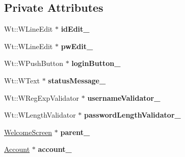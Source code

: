 \subsection*{Private Attributes}
\begin{DoxyCompactItemize}
\item 
Wt\+::\+W\+Line\+Edit $\ast$ {\bfseries id\+Edit\+\_\+}\hypertarget{classLoginWidget_abc73734457aad449ae29568968397304}{}\label{classLoginWidget_abc73734457aad449ae29568968397304}

\item 
Wt\+::\+W\+Line\+Edit $\ast$ {\bfseries pw\+Edit\+\_\+}\hypertarget{classLoginWidget_aa1b7c49a9d9a3d742f1a8f6a35c2071c}{}\label{classLoginWidget_aa1b7c49a9d9a3d742f1a8f6a35c2071c}

\item 
Wt\+::\+W\+Push\+Button $\ast$ {\bfseries login\+Button\+\_\+}\hypertarget{classLoginWidget_aa4b647e9a3ef1beea1695b4ba4a072d2}{}\label{classLoginWidget_aa4b647e9a3ef1beea1695b4ba4a072d2}

\item 
Wt\+::\+W\+Text $\ast$ {\bfseries status\+Message\+\_\+}\hypertarget{classLoginWidget_adb0cb4c69680f0210583b7b1cabc3f25}{}\label{classLoginWidget_adb0cb4c69680f0210583b7b1cabc3f25}

\item 
Wt\+::\+W\+Reg\+Exp\+Validator $\ast$ {\bfseries username\+Validator\+\_\+}\hypertarget{classLoginWidget_a3f2aa506217f54e466fb3954cfb77a12}{}\label{classLoginWidget_a3f2aa506217f54e466fb3954cfb77a12}

\item 
Wt\+::\+W\+Length\+Validator $\ast$ {\bfseries password\+Length\+Validator\+\_\+}\hypertarget{classLoginWidget_a524d5c1e4c3cb20d050ce272cdfac23e}{}\label{classLoginWidget_a524d5c1e4c3cb20d050ce272cdfac23e}

\item 
\hyperlink{classWelcomeScreen}{Welcome\+Screen} $\ast$ {\bfseries parent\+\_\+}\hypertarget{classLoginWidget_a29e3645e6f24bcf909ba28665cd3663c}{}\label{classLoginWidget_a29e3645e6f24bcf909ba28665cd3663c}

\item 
\hyperlink{classAccount}{Account} $\ast$ {\bfseries account\+\_\+}\hypertarget{classLoginWidget_ac4303f10fd4fcd7a6ff43dae796f90e7}{}\label{classLoginWidget_ac4303f10fd4fcd7a6ff43dae796f90e7}

\end{DoxyCompactItemize}


